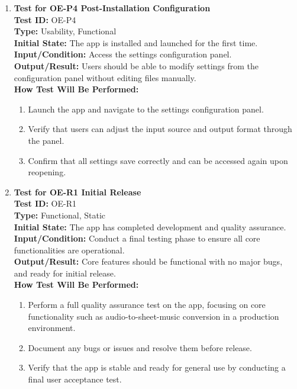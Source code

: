 \documentclass[12pt, titlepage]{article}
\begin{document}
\begin{enumerate}
    \item \textbf{Test for OE-P4 Post-Installation Configuration} \\
      \newline
      \textbf{Test ID:} OE-P4 \\
      \textbf{Type:} Usability, Functional \\
      \textbf{Initial State:} The app is installed and launched for the first time. \\
      \textbf{Input/Condition:} Access the settings configuration panel. \\
      \textbf{Output/Result:} Users should be able to modify settings from the configuration panel without editing files manually. \\
      \textbf{How Test Will Be Performed:}
      \begin{enumerate}
          \item Launch the app and navigate to the settings configuration panel.
          \item Verify that users can adjust the input source and output format through the panel.
          \item Confirm that all settings save correctly and can be accessed again upon reopening.
      \end{enumerate}

    \item \textbf{Test for OE-R1 Initial Release} \\
      \newline
      \textbf{Test ID:} OE-R1 \\
      \textbf{Type:} Functional, Static \\
      \textbf{Initial State:} The app has completed development and quality assurance. \\
      \textbf{Input/Condition:} Conduct a final testing phase to ensure all core functionalities are operational. \\
      \textbf{Output/Result:} Core features should be functional with no major bugs, and ready for initial release. \\
      \textbf{How Test Will Be Performed:}
      \begin{enumerate}
          \item Perform a full quality assurance test on the app, focusing on core functionality such as audio-to-sheet-music conversion in a production environment.
          \item Document any bugs or issues and resolve them before release.
          \item Verify that the app is stable and ready for general use by conducting a final user acceptance test.
      \end{enumerate}

\end{enumerate}
\end{document}
